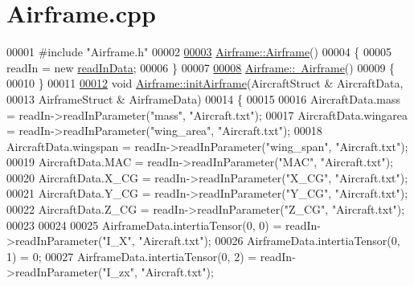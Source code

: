 \hypertarget{_airframe_8cpp_source}{}\section{Airframe.\+cpp}
\label{_airframe_8cpp_source}

\begin{DoxyCode}
00001 \textcolor{preprocessor}{#include "Airframe.h"}
00002 
\hyperlink{group___airframe_a5e6632c7d0c5bc5b889de6cc2407944f}{00003} \hyperlink{group___airframe_a5e6632c7d0c5bc5b889de6cc2407944f}{Airframe::Airframe}()
00004 \{
00005     readIn = \textcolor{keyword}{new} \hyperlink{classread_in_data}{readInData};
00006 \}
00007 
\hyperlink{group___airframe_af849116afbf7c4d7d2d5c189ff68cb7d}{00008} \hyperlink{group___airframe_af849116afbf7c4d7d2d5c189ff68cb7d}{Airframe::~Airframe}()
00009 \{
00010 \}
00011 
\hyperlink{group___airframe_a57b5f7a74d11723186f34fc183e1581b}{00012} \textcolor{keywordtype}{void} \hyperlink{group___airframe_a57b5f7a74d11723186f34fc183e1581b}{Airframe::initAirframe}(AircraftStruct & AircraftData,
00013                             AirframeStruct & AirframeData)
00014 \{
00015 
00016     AircraftData.mass       = readIn->readInParameter(\textcolor{stringliteral}{"mass"}, \textcolor{stringliteral}{"Aircraft.txt"});
00017     AircraftData.wingarea   = readIn->readInParameter(\textcolor{stringliteral}{"wing\_area"}, \textcolor{stringliteral}{"Aircraft.txt"});
00018     AircraftData.wingspan   = readIn->readInParameter(\textcolor{stringliteral}{"wing\_span"}, \textcolor{stringliteral}{"Aircraft.txt"});
00019     AircraftData.MAC        = readIn->readInParameter(\textcolor{stringliteral}{"MAC"}, \textcolor{stringliteral}{"Aircraft.txt"});
00020     AircraftData.X\_CG       = readIn->readInParameter(\textcolor{stringliteral}{"X\_CG"}, \textcolor{stringliteral}{"Aircraft.txt"});
00021     AircraftData.Y\_CG       = readIn->readInParameter(\textcolor{stringliteral}{"Y\_CG"}, \textcolor{stringliteral}{"Aircraft.txt"});
00022     AircraftData.Z\_CG       = readIn->readInParameter(\textcolor{stringliteral}{"Z\_CG"}, \textcolor{stringliteral}{"Aircraft.txt"});
00023 
00024 
00025     AirframeData.intertiaTensor(0, 0) = readIn->readInParameter(\textcolor{stringliteral}{"I\_X"}, \textcolor{stringliteral}{"Aircraft.txt"});
00026     AirframeData.intertiaTensor(0, 1) = 0;
00027     AirframeData.intertiaTensor(0, 2) = readIn->readInParameter(\textcolor{stringliteral}{"I\_zx"}, \textcolor{stringliteral}{"Aircraft.txt"});

\end{DoxyCode}
